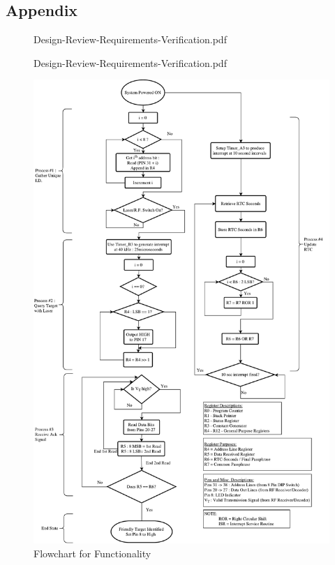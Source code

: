 \documentclass[letterpaper,10pt]{article}
\begin{document}
\begin{spacing}{1.15}
\section*{Appendix}
\begin{figure} [H]
	\centering
	 {Design-Review-Requirements-Verification.pdf}
\end{figure}
\clearpage
\begin{figure} [H]
	\centering
	 {Design-Review-Requirements-Verification.pdf}
\end{figure}
\clearpage
\begin{figure} [H]
	\centering
	\includegraphics[scale=0.450]{Friendly_Interrogator_Software_Flowchart.pdf}
	\caption{Flowchart for Functionality\label{fig:friendly-interrogator-software-flowchart}}
\end{figure}


\end{spacing}
\end{document}
